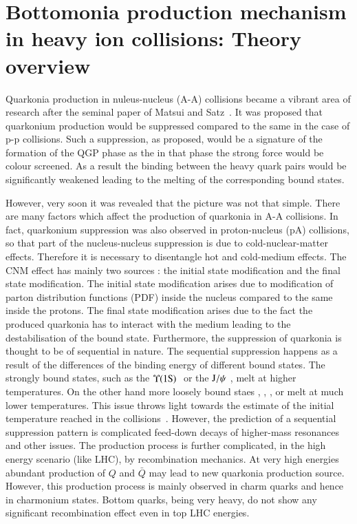 \section{Bottomonia production mechanism in heavy ion collisions: Theory overview}
\label{sec:Bottomonia_hi}

 Quarkonia production in nuleus-nucleus (A-A) collisions  became a vibrant area of research after the seminal 
paper of Matsui and Satz~\cite{Matsui:1986dk}. It was proposed that quarkonium production would be suppressed
compared to the same in the case of p-p collisions.  Such a suppression, as proposed, would be a signature of 
the formation of the QGP phase as the in that phase the strong force would be colour screened. As a result 
the binding between the heavy quark pairs would be significantly weakened leading to the melting of the corresponding 
bound states. 

However, very soon it was revealed that the picture was not that simple. There are many factors which affect the 
production of quarkonia in A-A collisions. 
In fact, quarkonium suppression was also observed in proton-nucleus (pA)
collisions, so that part of the nucleus-nucleus suppression is due to 
cold-nuclear-matter effects. Therefore it is necessary to disentangle hot 
and cold-medium effects. The CNM effect has mainly two sources : the initial state modification and the 
final state modification. The initial state modification arises due to modification of parton distribution 
functions (PDF) inside the nucleus compared to the same inside the protons. The final state modification 
arises due to the  fact the produced quarkonia has to interact with the medium leading to the destabilisation
of the bound state. Furthermore, the suppression of quarkonia is thought to be of sequential in nature.  
The sequential suppression happens as a result of the differences of the  binding energy of different bound states. 
The strongly bound states, such as the $\Upsilon\mathrm{(1S)}\hspace {0.05in}$ or the $\mathrm{J}/\psi\hspace {0.05in}$,  melt at higher 
temperatures. On the other hand  more loosely bound staes \psiP, \chic, \chib, 
\upsb or \upsc  melt at much lower temperatures.  This issue throws light towards the 
 estimate of the initial temperature reached in 
the collisions~\cite{Digal:2001ue}. However, the prediction of a sequential 
suppression pattern is complicated feed-down 
decays of higher-mass resonances and other issues. The production process is further 
complicated, in the high energy scenario (like LHC), by recombination mechanics. At very 
high energies abundant production of $Q$ and $\bar Q$ may lead to new quarkonia production 
source. However, this production process is mainly observed in charm quarks and hence in charmonium 
states. Bottom quarks, being very heavy, do not show any significant recombination effect even in top 
LHC energies.   


